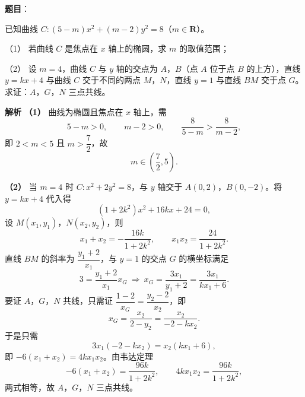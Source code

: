 \begin{answer}

\textbf{题目}：

已知曲线 $C:(5-m)x^2+(m-2)y^2=8$（$m\in\mathbf R$）。

（1） 若曲线 $C$ 是焦点在 $x$ 轴上的椭圆，求 $m$ 的取值范围；

（2） 设 $m=4$，曲线 $C$ 与 $y$ 轴的交点为 $A$，$B$（点 $A$ 位于点 $B$ 的上方），直线 $y=kx+4$ 与曲线 $C$ 交于不同的两点 $M$，$N$，直线 $y=1$ 与直线 $BM$ 交于点 $G$。求证：$A$，$G$，$N$ 三点共线。

\textbf{解析}
\textbf{（1）} 曲线为椭圆且焦点在 $x$ 轴上，需
\nopagebreak[4]
\[5-m>0,\qquad m-2>0,\qquad \frac8{5-m}>\frac8{m-2},\]
即 $2<m<5$ 且 $m>\dfrac72$，故
\nopagebreak[4]
\[m\in\left(\frac72,5\right).\]

\textbf{（2）} 当 $m=4$ 时 $C:x^2+2y^2=8$，与 $y$ 轴交于 $A(0,2)$，$B(0,-2)$。将 $y=kx+4$ 代入得
\nopagebreak[4]
\[(1+2k^2)x^2+16kx+24=0,\]
设 $M(x_1,y_1)$，$N(x_2,y_2)$，则
\nopagebreak[4]
\[x_1+x_2=-\frac{16k}{1+2k^2},\qquad x_1x_2=\frac{24}{1+2k^2}.\]
直线 $BM$ 的斜率为 $\dfrac{y_1+2}{x_1}$，与 $y=1$ 的交点 $G$ 的横坐标满足
\nopagebreak[4]
\[3=\frac{y_1+2}{x_1}x_G\ \Rightarrow\ x_G=\frac{3x_1}{y_1+2}=\frac{3x_1}{kx_1+6}.\]
要证 $A$，$G$，$N$ 共线，只需证 $\dfrac{1-2}{x_G}=\dfrac{y_2-2}{x_2}$，即
\nopagebreak[4]
\[x_G=\frac{x_2}{2-y_2}=\frac{x_2}{-2-kx_2}.\]
于是只需
\nopagebreak[4]
\[3x_1(-2-kx_2)=x_2(kx_1+6),\]
即 $-6(x_1+x_2)=4kx_1x_2$。由韦达定理
\nopagebreak[4]
\[-6(x_1+x_2)=\frac{96k}{1+2k^2},\qquad 4kx_1x_2=\frac{96k}{1+2k^2},\]
两式相等，故 $A$，$G$，$N$ 三点共线。



\end{answer}

